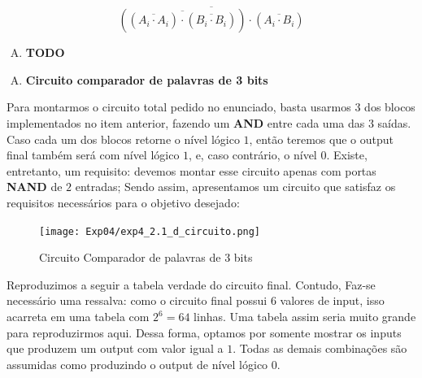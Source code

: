 \documentclass[12pt]{article}
\begin{document}
\begin{equation}
\overline{\left( \overline{(\overline{A_{i} \cdot A_{i}}) \cdot (\overline{B_{i} \cdot B_{i}})} \right) \cdot (\overline{A_{i} \cdot B_{i}})}
\end{equation}

\begin{enumerate}[C)]
\item \textbf{TODO}
\end{enumerate}

\begin{enumerate}[D)]
\item \textbf{Circuito comparador de palavras de 3 bits}
\end{enumerate}

Para montarmos o circuito total pedido no enunciado, basta usarmos $3$ dos
blocos implementados no item anterior, fazendo um \textbf{AND} entre cada uma
das $3$ saídas. Caso cada um dos blocos retorne o nível lógico $1$, então
teremos que o output final também será com nível lógico $1$, e, caso contrário,
o nível $0$. Existe, entretanto, um requisito: devemos montar esse circuito
apenas com portas \textbf{NAND} de $2$ entradas; Sendo assim, apresentamos um
circuito que satisfaz os requisitos necessários para o objetivo desejado:

\begin{figure}[H]
    \centering
    \texttt{[image: Exp04/exp4\_2.1\_d\_circuito.png]}
    \caption{Circuito Comparador de palavras de 3 bits}\label{fig:exp4_2.1_d_circuito.png}
\end{figure}

Reproduzimos a seguir a tabela verdade do circuito final. Contudo, Faz-se
necessário uma ressalva: como o circuito final possui $6$ valores de input, isso
acarreta em uma tabela com $2^{6} = 64$ linhas. Uma tabela assim seria muito
grande para reproduzirmos aqui. Dessa forma, optamos por somente mostrar os
inputs que produzem um output com valor igual a $1$. Todas as demais combinações
são assumidas como produzindo o output de nível lógico $0$.
\end{document}
